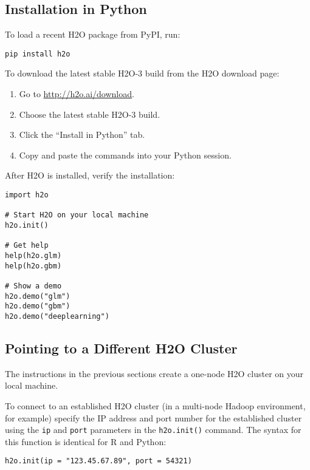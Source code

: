 \documentclass{standalone}
\begin{document}
\subsection{Installation in Python}

To load a recent H2O package from PyPI, run:

\begin{lstlisting}[style=python]
pip install h2o
\end{lstlisting}

To download the
latest stable H2O-3 build from the H2O download page:

\begin{minipage}{\textwidth}

\begin{enumerate}
\item Go to {\url{http://h2o.ai/download}}.
\item Choose the latest stable H2O-3 build.
\item Click the ``Install in Python'' tab.
\item Copy and paste the commands into your Python session.
\end{enumerate}

\end{minipage}

\bigskip
After H2O is installed, verify the installation:

\begin{minipage}{\textwidth}

\begin{lstlisting}[style=python]
import h2o

# Start H2O on your local machine
h2o.init()

# Get help
help(h2o.glm)
help(h2o.gbm)

# Show a demo
h2o.demo("glm")
h2o.demo("gbm")
h2o.demo("deeplearning")

\end{lstlisting}

\end{minipage}

\subsection{Pointing to a Different H2O Cluster}

The instructions in the previous sections create a one-node H2O cluster on your local machine. 

To connect to an established H2O cluster (in a multi-node Hadoop environment, for example) specify the IP address and port number for the established cluster using the \texttt{ip} and \texttt{port} parameters in the \texttt{h2o.init()} command.  The syntax for this function is identical for R and Python:
\medskip  

\begin{lstlisting}[style=R]
h2o.init(ip = "123.45.67.89", port = 54321)
\end{lstlisting}

\end{document}
